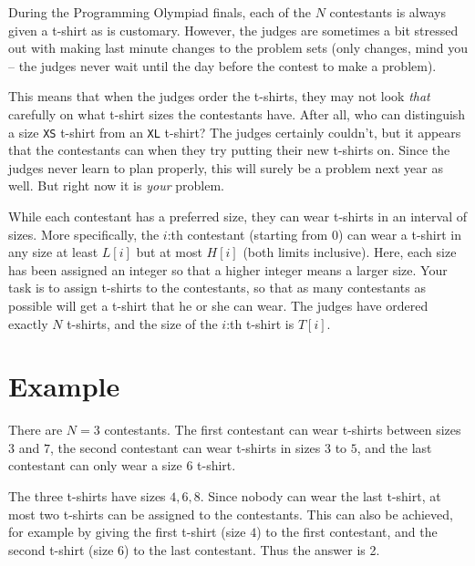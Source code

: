 \newcommand\version{v1}
During the Programming Olympiad finals, each of the $N$ contestants is always given a t-shirt as is customary. However, the judges
are sometimes a bit stressed out with making last minute changes to the problem sets (only changes, mind you -- the judges
never wait until the day before the contest to make a problem).

This means that when the judges order the t-shirts, they may not look \emph{that} carefully on what t-shirt
sizes the contestants have. After all, who can distinguish
a size \texttt{XS} t-shirt from an \texttt{XL} t-shirt? The judges certainly couldn't, but it appears that the contestants can when they try putting their new t-shirts on. 
Since the judges never learn to plan properly, this will surely be a problem next year as well. But right now it is \emph{your} problem.

While each contestant has a preferred size, they can wear t-shirts in an interval of sizes. More specifically,
the $i$:th contestant (starting from 0) can wear a t-shirt in any size at least $L[i]$ but at most $H[i]$ (both limits inclusive). 
Here, each size has been assigned an integer so that a higher integer means a larger size.
Your task is to assign t-shirts to the contestants, so that as many contestants as possible will get a t-shirt
that he or she can wear. The judges have ordered exactly $N$ t-shirts, and the size of the $i$:th t-shirt is $T[i]$.

\section*{Example}
There are $N = 3$ contestants. The first contestant can wear t-shirts between sizes $3$ and $7$,
the second contestant can wear t-shirts in sizes $3$ to $5$, and the last contestant can only wear a size $6$ t-shirt.

The three t-shirts have sizes $4, 6, 8$. Since nobody can wear the last t-shirt, at most two t-shirts
can be assigned to the contestants. This can also be achieved, for example by giving the first t-shirt (size $4$) to
the first contestant, and the second t-shirt (size $6$) to the last contestant. Thus the answer is 2.

